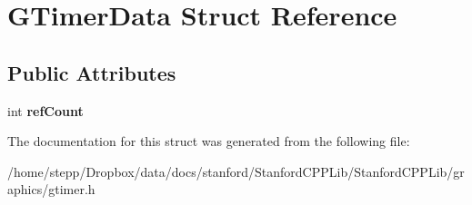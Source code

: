 \hypertarget{structGTimerData}{}\section{G\+Timer\+Data Struct Reference}
\label{structGTimerData}
\subsection*{Public Attributes}
\begin{DoxyCompactItemize}
\item 
\mbox{\label{structGTimerData_aa93465e9025d37a2701bf8df7d2a28d8}} 
int {\bfseries ref\+Count}
\end{DoxyCompactItemize}


The documentation for this struct was generated from the following file\+:\begin{DoxyCompactItemize}
\item 
/home/stepp/\+Dropbox/data/docs/stanford/\+Stanford\+C\+P\+P\+Lib/\+Stanford\+C\+P\+P\+Lib/graphics/gtimer.\+h\end{DoxyCompactItemize}
